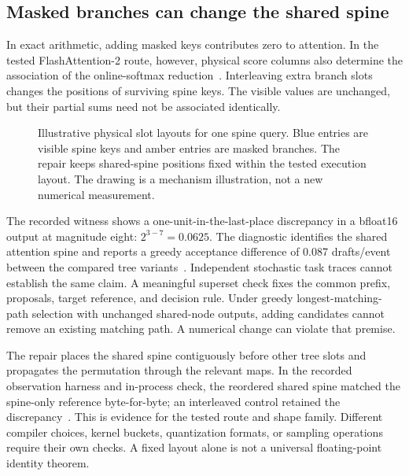 \documentclass[conference]{IEEEtran}
\begin{document}
\subsection{Masked branches can change the shared spine}
In exact arithmetic, adding masked keys contributes zero to attention. In the tested FlashAttention-2 route, however, physical score columns also determine the association of the online-softmax reduction~\cite{dao2023flashattention,lumo2026spine}. Interleaving extra branch slots changes the positions of surviving spine keys. The visible values are unchanged, but their partial sums need not be associated identically.

\begin{figure}[t]
\centering

\caption{Illustrative physical slot layouts for one spine query. Blue entries are visible spine keys and amber entries are masked branches. The repair keeps shared-spine positions fixed within the tested execution layout. The drawing is a mechanism illustration, not a new numerical measurement.}
\label{fig:layout}
\end{figure}

The recorded witness shows a one-unit-in-the-last-place discrepancy in a bfloat16 output at magnitude eight: $2^{3-7}=0.0625$. The diagnostic identifies the shared attention spine and reports a greedy acceptance difference of 0.087 drafts/event between the compared tree variants~\cite{lumo2026spine}. Independent stochastic task traces cannot establish the same claim. A meaningful superset check fixes the common prefix, proposals, target reference, and decision rule. Under greedy longest-matching-path selection with unchanged shared-node outputs, adding candidates cannot remove an existing matching path. A numerical change can violate that premise.

The repair places the shared spine contiguously before other tree slots and propagates the permutation through the relevant maps. In the recorded observation harness and in-process check, the reordered shared spine matched the spine-only reference byte-for-byte; an interleaved control retained the discrepancy~\cite{lumo2026spine}. This is evidence for the tested route and shape family. Different compiler choices, kernel buckets, quantization formats, or sampling operations require their own checks. A fixed layout alone is not a universal floating-point identity theorem.
\end{document}
